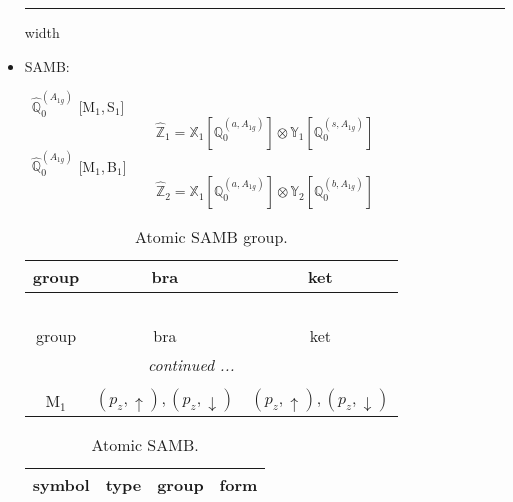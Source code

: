 \documentclass[fleqn,10pt,landscape]{article}
\begin{document}
\begin{itemize}
 \hfil \hrule height 1mm width \textwidth \hfil

\item SAMB:

\vspace{4mm}
\noindent {} $\,\,\,\hat{\mathbb{Q}}_{0}^{(A_{1g})}$ [M$_{1}$,\,S$_{1}$]
\begin{dmath*}
\hat{\mathbb{Z}}_{1}=\mathbb{X}_{1}[\mathbb{Q}_{0}^{(a,A_{1g})}] \otimes\mathbb{Y}_{1}[\mathbb{Q}_{0}^{(s,A_{1g})}]
\end{dmath*}
\vspace{4mm}
\noindent {} $\,\,\,\hat{\mathbb{Q}}_{0}^{(A_{1g})}$ [M$_{1}$,\,B$_{1}$]
\begin{dmath*}
\hat{\mathbb{Z}}_{2}=\mathbb{X}_{1}[\mathbb{Q}_{0}^{(a,A_{1g})}] \otimes\mathbb{Y}_{2}[\mathbb{Q}_{0}^{(b,A_{1g})}]
\end{dmath*}
\begin{center}
\renewcommand{\arraystretch}{1.3}
\begin{longtable}{c|c|c}
\caption{Atomic SAMB group.}
 \\
 \hline \hline
group & bra & ket \\ \hline \endfirsthead

\multicolumn{2}{l}{\tablename\ \thetable{}} \\
 \hline \hline
group & bra & ket \\ \hline \endhead

 \hline \hline
\multicolumn{2}{r}{\footnotesize\it continued ...} \\ \endfoot

 \hline \hline
\multicolumn{2}{r}{} \\ \endlastfoot

M$_{1}$ & $(p_{z},\uparrow), (p_{z},\downarrow)$ & $(p_{z},\uparrow), (p_{z},\downarrow)$ \\
\end{longtable}
\end{center}
\begin{center}
\renewcommand{\arraystretch}{1.3}
\begin{longtable}{c|c|c|c}
\caption{Atomic SAMB.}
 \\
 \hline \hline
symbol & type & group & form \\ \hline \endfirsthead


\end{longtable}
\end{center}
\end{itemize}
\end{document}
